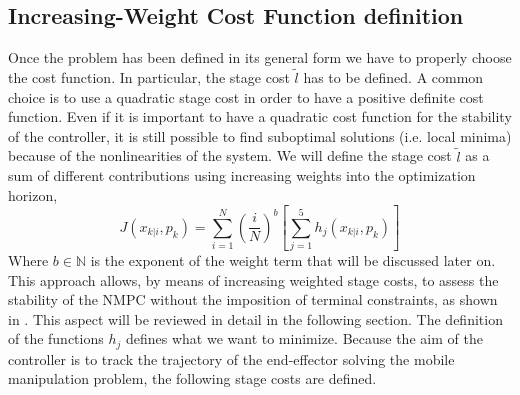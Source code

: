 \subsection{Increasing-Weight Cost Function definition}

Once the problem has been defined in its general form we have to properly choose the cost function. In particular, the stage cost $\tilde{l}$ has to be defined. A common choice is to use a quadratic stage cost in order to have a positive definite cost function. Even if it is important to have a quadratic cost function for the stability of the controller, it is still possible to find suboptimal solutions (i.e. local minima) because of the nonlinearities of the system. We will define the stage cost $\tilde{l}$ as a sum of different contributions using increasing weights into the optimization horizon, 
\begin{equation}\label{costfunctionh}
J({x}_{k|i},p_k)=\sum_{i=1}^{N}\left(\frac{i}{N}\right)^b \left[ \sum_{j=1}^{5} h_j({x}_{k|i},p_k) \right]
\end{equation} 
Where $b \in \mathbb{N}$ is the exponent of the weight term that will be discussed later on. This approach allows, by means of increasing weighted stage costs, to assess the stability of the NMPC without the imposition of terminal constraints, as shown in \cite{alamir2018stability}. This aspect will be reviewed in detail in the following section.
The definition of the functions $h_j$ defines what we want to minimize. Because the aim of the controller is to track the trajectory of the end-effector solving the mobile manipulation problem, the following stage costs are defined.
